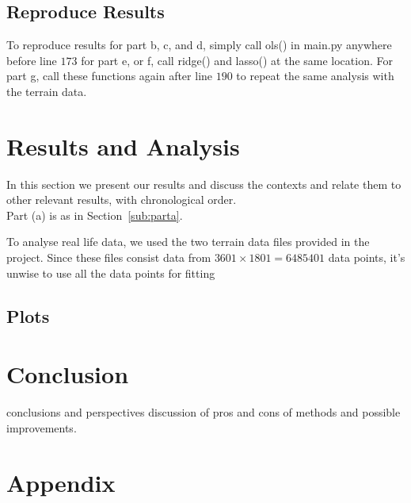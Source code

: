 \documentclass[sigconf, nonacm]{acmart}
\begin{document}
\subsection{Reproduce Results}
To reproduce results for part b, c, and d, simply call 
{\color{red} ols() } in main.py anywhere before line $ 173 $ for part e, or f, call {\color{red} ridge() } and {\color{red} lasso() } at the same location. For part g, call these functions again after line $ 190 $ to repeat the same analysis with the terrain data.


\section{Results and Analysis}
In this section we present our results and discuss the contexts and relate them to other relevant results, with chronological order.\\
Part (a) is as in Section~\ref{sub:parta}.

To analyse real life data, we used the two terrain data files provided in the project. Since these files consist data from $ 3601 \times 1801 = 6485401$ data points, it's unwise to use all the data points for fitting 
\subsection{Plots}
\section{Conclusion}
conclusions and perspectives
discussion of pros and cons of methods and possible improvements.


\section*{Appendix}

\begin{acks}

\end{acks}




\end{document}
